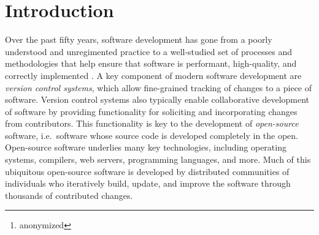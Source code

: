 \documentclass[nohyperref]{article}
\theoremstyle{plain}
\theoremstyle{definition}
\theoremstyle{remark}
\begin{document}
\printAffiliationsAndNotice{\icmlEqualContribution} %

\begin{abstract}
Currently, most machine learning models are trained by a centralized team and are rarely updated.
In contrast, open-source software development involves the iterative development of a shared artifact through distributed collaboration of many individuals using version control software.
In the interest of enabling collaborative and continual improvement of machine learning models, we introduce Git-Theta, a version control system for machine learning models.
Git-Theta is an extension to Git, the most widely used version control software, thereby allowing fine-grained tracking of changes to a model's parameters alongside code and other artifacts.
Existing version control systems for model checkpoints treat the model as a binary blob and do not support cheaply communicable updates or merging, which are fundamentally important operations for receiving and incorporating changes from contributors.
Git-Theta supports various existing approaches for communication-efficient updates and merging and also includes a plugin system that enables downstream users to easily add support for new functionality.
In this paper, we introduce Git-Theta'sthe key features and design choices.
We also include an example use-case of Git-Theta where a pre-trained model is adapted to new tasks through parameter-efficient fine-tuning, merging, and manual removal of parameters.
We publicly release Git-Theta in hopes of kickstarting a new era of collaborative model development.\footnote{anonymized}
\end{abstract}

\section{Introduction}

Over the past fifty years, software development has gone from a poorly understood and unregimented practice to a well-studied set of processes and methodologies that help ensure that software is performant, high-quality, and correctly implemented \citep{brooks1975mythical}.
A key component of modern software development are \textit{version control systems}, which allow fine-grained tracking of changes to a piece of software.
Version control systems also typically enable collaborative development of software by providing functionality for soliciting and incorporating changes from contributors.
This functionality is key to the development of \textit{open-source} software, i.e.\ software whose source code is developed completely in the open.
Open-source software underlies many key technologies, including operating systems, compilers, web servers, programming languages, and more.
Much of this ubiquitous open-source software is developed by distributed communities of individuals who iteratively build, update, and improve the software through thousands of contributed changes.
\end{document}
